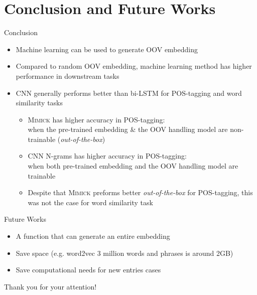 \documentclass{beamer}
\begin{document}
\section{Conclusion and Future Works}
\begin{frame}{Conclusion}
    \begin{itemize}
        \item Machine learning can be
        used to generate OOV embedding
        \item Compared to random OOV embedding, machine learning
        method has higher performance in downstream tasks
        \item CNN generally performs better than bi-LSTM for POS-tagging and word
        similarity tasks
        \begin{itemize}
            \item \textsc{Mimick} has higher accuracy in
            POS-tagging:\\
            when the pre-trained embedding \& the OOV handling model
            are non-trainable (\textit{out-of-the-box})
            \item CNN N-grams has higher accuracy in POS-tagging:\\
            when both pre-trained embedding and the OOV handling model
            are trainable
            \item Despite that \textsc{Mimick} preforms better
            \textit{out-of-the-box} for POS-tagging, this was not the case for word
            similarity task
        \end{itemize}
    \end{itemize}
\end{frame}

\begin{frame}{Future Works}
    \begin{itemize}
        \item A function that can generate an entire embedding
        \item Save space (e.g. word2vec 3 million words and phrases is
        around 2GB)
        \item Save computational needs for new entries cases
    \end{itemize}
\end{frame}

\begin{frame}
    \Huge{\centerline{Thank you for your attention!}}
\end{frame}
    


\end{document}
